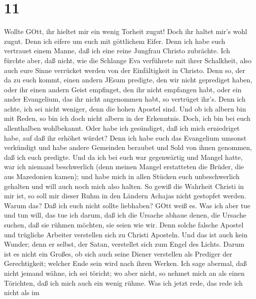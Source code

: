 \hypertarget{section-10}{%
\section{11}\label{section-10}}

 Wollte GOtt, ihr hieltet mir ein wenig Torheit zugut! Doch
ihr haltet mir's wohl zugut.  Denn ich eifere um euch mit
göttlichem Eifer. Denn ich habe euch vertrauet einem Manne, daß ich eine
reine Jungfrau Christo zubrächte.  Ich fürchte aber, daß
nicht, wie die Schlange Eva verführete mit ihrer Schalkheit, also auch
eure Sinne verrücket werden von der Einfältigkeit in Christo.
 Denn so, der da zu euch kommt, einen andern JEsum predigte,
den wir nicht geprediget haben, oder ihr einen andern Geist empfinget,
den ihr nicht empfangen habt, oder ein ander Evangelium, das ihr nicht
angenommen habt, so vertrüget ihr's.  Denn ich achte, ich
sei nicht weniger, denn die hohen Apostel sind.  Und ob ich
albern bin mit Reden, so bin ich doch nicht albern in der Erkenntnis.
Doch, ich bin bei euch allenthalben wohlbekannt.  Oder habe
ich gesündiget, daß ich mich erniedriget habe, auf daß ihr erhöhet
würdet? Denn ich habe euch das Evangelium umsonst verkündigt
 und habe andere Gemeinden beraubet und Sold von ihnen
genommen, daß ich euch predigte.  Und da ich bei euch war
gegenwärtig und Mangel hatte, war ich niemand beschwerlich (denn meinen
Mangel erstatteten die Brüder, die aus Mazedonien kamen); und habe mich
in allen Stücken euch unbeschwerlich gehalten und will auch noch mich
also halten.  So gewiß die Wahrheit Christi in mir ist, so
soll mir dieser Ruhm in den Ländern Achajas nicht gestopfet werden.
 Warum das? Daß ich euch nicht sollte liebhaben? GOtt weiß
es.  Was ich aber tue und tun will, das tue ich darum, daß
ich die Ursache abhaue denen, die Ursache suchen, daß sie rühmen
möchten, sie seien wie wir.  Denn solche falsche Apostel
und trügliche Arbeiter verstellen sich zu Christi Aposteln.
 Und das ist auch kein Wunder; denn er selbst, der Satan,
verstellet sich zum Engel des Lichts.  Darum ist es nicht
ein Großes, ob sich auch seine Diener verstellen als Prediger der
Gerechtigkeit; welcher Ende sein wird nach ihren Werken. 
Ich sage abermal, daß nicht jemand wähne, ich sei töricht; wo aber
nicht, so nehmet mich an als einen Törichten, daß ich mich auch ein
wenig rühme.  Was ich jetzt rede, das rede ich nicht als im
